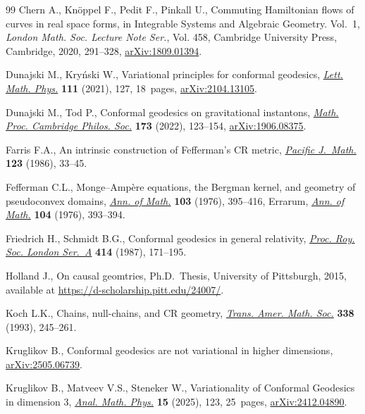 \documentclass[pdftex]{sigma}
\numberwithin{equation}{section}
\begin{document}
\begin{thebibliography}{99}
Chern A., Kn\"oppel F., Pedit F., Pinkall U., Commuting {H}amiltonian flows of
 curves in real space forms, in Integrable Systems and Algebraic Geometry.
 {V}ol.~1, \textit{London Math. Soc. Lecture Note Ser.}, Vol. 458, Cambridge
 University Press, Cambridge, 2020, 291--328,
 \href{http://arxiv.org/abs/1809.01394}{arXiv:1809.01394}.

Dunajski M., Kry\'nski W., Variational principles for conformal geodesics,
 \href{https://doi.org/10.1007/s11005-021-01469-z}{\textit{Lett. Math. Phys.}}
 \textbf{111} (2021), 127, 18~pages,
 \href{http://arxiv.org/abs/2104.13105}{arXiv:2104.13105}.

Dunajski M., Tod P., Conformal geodesics on gravitational instantons,
 \href{https://doi.org/10.1017/S0305004121000463}{\textit{Math. Proc.
 Cambridge Philos. Soc.}} \textbf{173} (2022), 123--154,
 \href{http://arxiv.org/abs/1906.08375}{arXiv:1906.08375}.

Farris F.A., An intrinsic construction of {F}efferman's {CR} metric,
 \href{https://doi.org/10.2140/pjm.1986.123.33}{\textit{Pacific J.~Math.}}
 \textbf{123} (1986), 33--45.

Fefferman C.L., Monge--{A}mp\`ere equations, the {B}ergman kernel, and geometry
 of pseudoconvex domains, \href{https://doi.org/10.2307/1970945}{\textit{Ann.
 of Math.}} \textbf{103} (1976), 395--416, {E}rrarum,
 \href{https://doi.org/10.2307/1970961}{\textit{Ann. of Math.}} \textbf{104}
 (1976), 393--394.

Friedrich H., Schmidt B.G., Conformal geodesics in general relativity,
 \href{https://doi.org/10.1098/rspa.1987.0139}{\textit{Proc. Roy. Soc. London
 Ser.~A}} \textbf{414} (1987), 171--195.

Holland J., On causal geomtries, Ph.D.~Thesis, {U}niversity of Pittsburgh,
 2015, available at \url{https://d-scholarship.pitt.edu/24007/}.

Koch L.K., Chains, null-chains, and {CR} geometry,
 \href{https://doi.org/10.2307/2154455}{\textit{Trans. Amer. Math. Soc.}}
 \textbf{338} (1993), 245--261.

Kruglikov B., Conformal geodesics are not variational in higher dimensions,
 \href{http://arxiv.org/abs/2505.06739}{arXiv:2505.06739}.

Kruglikov B., Matveev V.S., Steneker W., Variationality of {C}onformal
 {G}eodesics in dimension 3,
 \href{https://doi.org/10.1007/s13324-025-01124-z}{\textit{Anal. Math. Phys.}}
 \textbf{15} (2025), 123, 25~pages,
 \href{http://arxiv.org/abs/2412.04890}{arXiv:2412.04890}.


\end{thebibliography}
\end{document}
